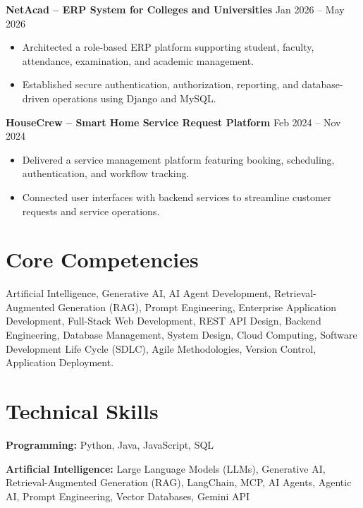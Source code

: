 \documentclass[10pt,a4paper]{article}
\begin{document}
\textbf{NetAcad -- ERP System for Colleges and Universities} \hfill Jan 2026 -- May 2026

\begin{itemize}
\item Architected a role-based ERP platform supporting student, faculty, attendance, examination, and academic management.
\item Established secure authentication, authorization, reporting, and database-driven operations using Django and MySQL.
\end{itemize}

\textbf{HouseCrew -- Smart Home Service Request Platform} \hfill Feb 2024 -- Nov 2024

\begin{itemize}
\item Delivered a service management platform featuring booking, scheduling, authentication, and workflow tracking.
\item Connected user interfaces with backend services to streamline customer requests and service operations.
\end{itemize}

\section{Core Competencies}

Artificial Intelligence, Generative AI, AI Agent Development, Retrieval-Augmented Generation (RAG), Prompt Engineering, Enterprise Application Development, Full-Stack Web Development, REST API Design, Backend Engineering, Database Management, System Design, Cloud Computing, Software Development Life Cycle (SDLC), Agile Methodologies, Version Control, Application Deployment.

\section{Technical Skills}

\textbf{Programming:} Python, Java, JavaScript, SQL

\textbf{Artificial Intelligence:} Large Language Models (LLMs), Generative AI, Retrieval-Augmented Generation (RAG), LangChain, MCP, AI Agents, Agentic AI, Prompt Engineering, Vector Databases, Gemini API
\end{document}
